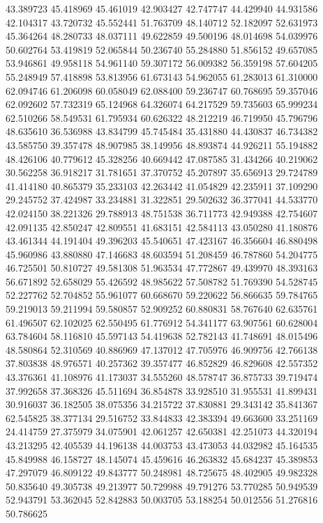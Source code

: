 43.389723
45.418969
45.461019
42.903427
42.747747
44.429940
44.931586
42.104317
43.720732
45.552441
51.763709
48.140712
52.182097
52.631973
45.364264
48.280733
48.037111
49.622859
49.500196
48.014698
54.039976
50.602764
53.419819
52.065844
50.236740
55.284880
51.856152
49.657085
53.946861
49.958118
54.961140
59.307172
56.009382
56.359198
57.604205
55.248949
57.418898
53.813956
61.673143
54.962055
61.283013
61.310000
62.094746
61.206098
60.058049
62.088400
59.236747
60.768695
59.357046
62.092602
57.732319
65.124968
64.326074
64.217529
59.735603
65.999234
62.510266
58.549531
61.795934
60.626322
48.212219
46.719950
45.796796
48.635610
36.536988
43.834799
45.745484
35.431880
44.430837
46.734382
43.585750
39.357478
48.907985
38.149956
48.893874
44.926211
55.194882
48.426106
40.779612
45.328256
40.669442
47.087585
31.434266
40.219062
30.562258
36.918217
31.781651
37.370752
45.207897
35.656913
29.724789
41.414180
40.865379
35.233103
42.263442
41.054829
42.235911
37.109290
29.245752
37.424987
33.234881
31.322851
29.502632
36.377041
44.533770
42.024150
38.221326
29.788913
48.751538
36.711773
42.949388
42.754607
42.091135
42.850247
42.809551
41.683151
42.584113
43.050280
41.180876
43.461344
44.191404
49.396203
45.540651
47.423167
46.356604
46.880498
45.960986
43.880880
47.146683
48.603594
51.208459
46.787860
54.204775
46.725501
50.810727
49.581308
51.963534
47.772867
49.439970
48.393163
56.671892
52.658029
55.426592
48.985622
57.508782
51.769390
54.528745
52.227762
52.704852
55.961077
60.668670
59.220622
56.866635
59.784765
59.219013
59.211994
59.580857
52.909252
60.880831
58.767640
62.635761
61.496507
62.102025
62.550495
61.776912
54.341177
63.907561
60.628004
63.784604
58.116810
45.597143
54.419638
52.782143
41.748691
48.015496
48.580864
52.310569
40.886969
47.137012
47.705976
46.909756
42.766138
37.803838
48.976571
40.257362
39.357477
46.852829
46.829608
42.557352
43.376361
41.108976
41.173037
34.555260
48.578747
36.875733
39.719474
37.992658
37.368326
45.511694
36.854878
33.928510
31.955531
41.899431
30.916037
36.182505
38.075356
34.215722
37.830881
29.343142
35.841367
62.545825
38.377134
29.516752
33.844833
42.383394
49.663600
33.251169
24.414759
27.375979
34.075901
42.061257
42.650381
42.251073
44.320194
43.213295
42.405539
44.196138
44.003753
43.473053
44.032982
45.164535
45.849988
46.158727
48.145074
45.459616
46.263832
45.684237
45.389853
47.297079
46.809122
49.843777
50.248981
48.725675
48.402905
49.982328
50.835640
49.305738
49.213977
50.729988
49.791276
53.770285
50.949539
52.943791
53.362045
52.842883
50.003705
53.188254
50.012556
51.276816
50.786625
